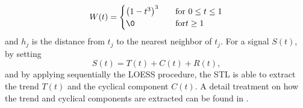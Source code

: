 \documentclass[../Main/thesis.tex]{subfiles}
\begin{document}
\begin{equation}
W(t) = 
  \begin{cases}
  \left(1-t^{3}\right)^{3} &\quad\text{for } 0\leq t \le 1\\
   \0 &\quad\text{for} t\geq 1
 \end{cases}
\end{equation}
and $h_{j}$ is the distance from $t_{j}$ to the nearest neighbor of $t_{j}$. For a signal $S(t)$, by setting 
\begin{equation}
S(t) = T(t) + C(t) + R(t), \nonumber
\end{equation}  
and by applying sequentially the LOESS procedure, the STL is able to extract the trend $T(t)$ and the cyclical component $C(t)$. A detail treatment on how the trend and cyclical components are extracted can be found in  \cite{Cleveland-et-al-1990}.




\end{document}
